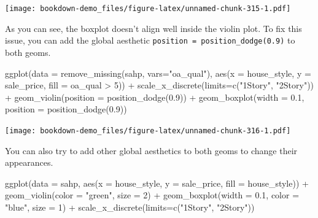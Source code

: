 \documentclass[
]{book}
\newenvironment{Shaded}{\begin{snugshade}}{\end{snugshade}}
\newcommand{\AttributeTok}[1]{\textcolor[rgb]{0.77,0.63,0.00}{#1}}
\newcommand{\DecValTok}[1]{\textcolor[rgb]{0.00,0.00,0.81}{#1}}
\newcommand{\FloatTok}[1]{\textcolor[rgb]{0.00,0.00,0.81}{#1}}
\newcommand{\FunctionTok}[1]{\textcolor[rgb]{0.00,0.00,0.00}{#1}}
\newcommand{\NormalTok}[1]{#1}
\newcommand{\SpecialCharTok}[1]{\textcolor[rgb]{0.00,0.00,0.00}{#1}}
\newcommand{\StringTok}[1]{\textcolor[rgb]{0.31,0.60,0.02}{#1}}
\begin{document}
\texttt{[image: bookdown-demo\_files/figure-latex/unnamed-chunk-315-1.pdf]}

As you can see, the boxplot doesn't align well inside the violin plot. To fix this issue, you can add the global aesthetic \texttt{position\ =\ position\_dodge(0.9)} to both geoms.

\begin{Shaded}
\begin{Highlighting}[]
\FunctionTok{ggplot}\NormalTok{(}\AttributeTok{data =} \FunctionTok{remove\_missing}\NormalTok{(sahp, }\AttributeTok{vars=}\StringTok{"oa\_qual"}\NormalTok{), }\FunctionTok{aes}\NormalTok{(}\AttributeTok{x =}\NormalTok{ house\_style, }\AttributeTok{y =}\NormalTok{ sale\_price, }\AttributeTok{fill =}\NormalTok{ oa\_qual }\SpecialCharTok{\textgreater{}} \DecValTok{5}\NormalTok{)) }\SpecialCharTok{+} 
  \FunctionTok{scale\_x\_discrete}\NormalTok{(}\AttributeTok{limits=}\FunctionTok{c}\NormalTok{(}\StringTok{"1Story"}\NormalTok{, }\StringTok{"2Story"}\NormalTok{)) }\SpecialCharTok{+}
  \FunctionTok{geom\_violin}\NormalTok{(}\AttributeTok{position =} \FunctionTok{position\_dodge}\NormalTok{(}\FloatTok{0.9}\NormalTok{)) }\SpecialCharTok{+}  
  \FunctionTok{geom\_boxplot}\NormalTok{(}\AttributeTok{width =} \FloatTok{0.1}\NormalTok{, }\AttributeTok{position =} \FunctionTok{position\_dodge}\NormalTok{(}\FloatTok{0.9}\NormalTok{))}
\end{Highlighting}
\end{Shaded}

\texttt{[image: bookdown-demo\_files/figure-latex/unnamed-chunk-316-1.pdf]}

You can also try to add other global aesthetics to both geoms to change their appearances.

\begin{Shaded}
\begin{Highlighting}[]
\FunctionTok{ggplot}\NormalTok{(}\AttributeTok{data =}\NormalTok{ sahp, }\FunctionTok{aes}\NormalTok{(}\AttributeTok{x =}\NormalTok{ house\_style, }\AttributeTok{y =}\NormalTok{ sale\_price, }\AttributeTok{fill =}\NormalTok{ house\_style)) }\SpecialCharTok{+} 
  \FunctionTok{geom\_violin}\NormalTok{(}\AttributeTok{color =} \StringTok{"green"}\NormalTok{, }\AttributeTok{size =} \DecValTok{2}\NormalTok{) }\SpecialCharTok{+} 
  \FunctionTok{geom\_boxplot}\NormalTok{(}\AttributeTok{width =} \FloatTok{0.1}\NormalTok{, }\AttributeTok{color =} \StringTok{"blue"}\NormalTok{, }\AttributeTok{size =} \DecValTok{1}\NormalTok{) }\SpecialCharTok{+} 
  \FunctionTok{scale\_x\_discrete}\NormalTok{(}\AttributeTok{limits=}\FunctionTok{c}\NormalTok{(}\StringTok{"1Story"}\NormalTok{, }\StringTok{"2Story"}\NormalTok{))}
\end{Highlighting}
\end{Shaded}
\end{document}
